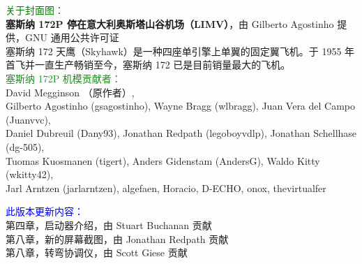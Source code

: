 


\ifchinese
\date{FlightGear 手册\\
\today\\
适用于 \FlightGear{} \version{} 版\\
\small 佟辉（中文翻译）}
\fi

\maketitle
\noindent \small \textcolor{green}{关于封面图：}\\
\textbf{塞斯纳 172P 停在意大利奥斯塔山谷机场（LIMV）}，由 Gilberto Agostinho 提供，GNU 通用公共许可证\\

\noindent 塞斯纳 172 天鹰（Skyhawk）是一种四座单引擎上单翼的固定翼飞机。于 1955 年首飞并一直生产畅销至今，塞斯纳 172 已是目前销量最大的飞机。\\

\noindent \textcolor{ForestGreen}{塞斯纳 172P 机模贡献者：}\\
David Megginson （原作者）,\\
Gilberto Agostinho (gsagostinho), Wayne Bragg (wlbragg), Juan Vera del Campo (Juanvvc),\\
Daniel Dubreuil (Dany93), Jonathan Redpath (legoboyvdlp), Jonathan Schellhase (dg-505),\\
Tuomas Kuosmanen (tigert), Anders Gidenstam (AndersG), Waldo Kitty (wkitty42),\\
Jarl Arntzen (jarlarntzen), algefaen, Horacio, D-ECHO, onox, thevirtualfer
\vskip 5cm

\noindent \textcolor{blue}{此版本更新内容：}\\
第四章，启动器介绍，由 Stuart Buchanan 贡献\\
第八章，新的屏幕截图，由 Jonathan Redpath 贡献\\
第八章，转弯协调仪，由 Scott Giese 贡献\\


\tableofcontents

